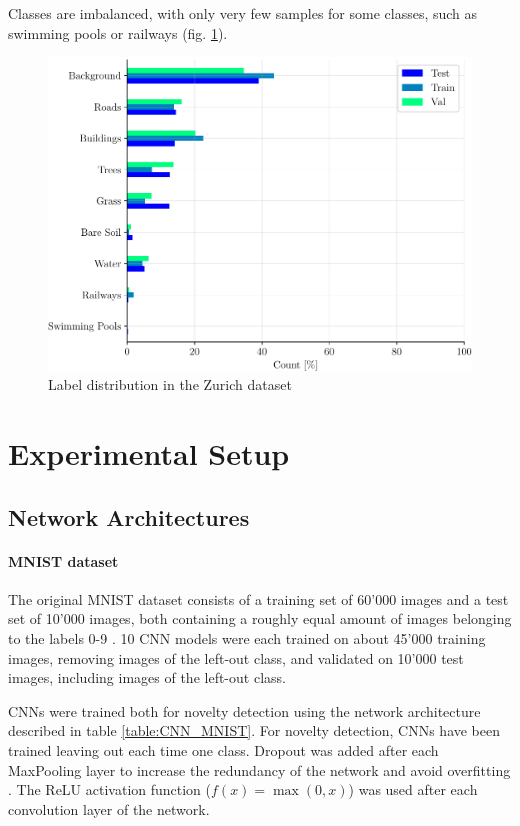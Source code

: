 \documentclass[10pt]{article}
\begin{document}
Classes are imbalanced, with only very few samples for some classes, such as swimming pools or railways (fig. \ref{fig:label-dist-zurich}).

\begin{figure}[H]
    \centering
    \includegraphics[width=.7\textwidth]{ZH_dist}
    \caption{Label distribution in the Zurich dataset}
    \label{fig:label-dist-zurich}
\end{figure}


\section{Experimental Setup}
\subsection{Network Architectures}
\paragraph{MNIST dataset} The original MNIST dataset consists of a training set of 60'000 images and a test set of 10'000 images, both containing a roughly equal amount of images belonging to the labels 0-9 \cite{mnist}. 10 \gls{CNN} models were each trained on about 45'000 training images, removing images of the left-out class, and validated on 10'000 test images, including images of the left-out class.

\glspl{CNN} were trained both for novelty detection using the network architecture described in table \ref{table:CNN_MNIST}. For novelty detection, \glspl{CNN} have been trained leaving out each time one class. Dropout was added after each MaxPooling layer to increase the redundancy of the network and avoid overfitting \cite{Srivastava2014DropoutAS}. The \gls{ReLU} activation function ($f(x) = \max(0, x)$) was used after each convolution layer of the network. 
\end{document}
